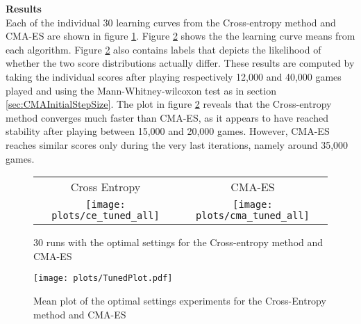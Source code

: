 \textbf{Results}\\
Each of the individual 30 learning curves from the Cross-entropy method
and CMA-ES are shown in figure \ref{fig:tunedAll}. Figure \ref{fig:TunedMean} shows the the
learning curve means from each algorithm. Figure \ref{fig:TunedMean} also contains 
labels that depicts the likelihood of whether the two score distributions actually differ.
These results are computed by taking the individual scores after playing respectively 
12,000 and 40,000 games played and using the Mann-Whitney-wilcoxon test
as in section \ref{sec:CMAInitialStepSize}. The plot in figure \ref{fig:TunedMean}
reveals that the Cross-entropy method converges much faster than CMA-ES, as it 
appears to have reached stability after playing between 15,000 and 20,000 games. However,
CMA-ES reaches similar scores only during the very last iterations, namely around 35,000 games.
\begin{figure}[H]
\begin{tabular}{@{}c@{}c@{}}
Cross Entropy & CMA-ES\\
\texttt{[image: plots/ce\_tuned\_all]} &
\texttt{[image: plots/cma\_tuned\_all]}
\end{tabular}
\caption{30 runs with the optimal settings for the Cross-entropy method and CMA-ES \label{fig:tunedAll}}
\end{figure}

\begin{figure}[H]
\centering
\texttt{[image: plots/TunedPlot.pdf]}
\caption{Mean plot of the optimal settings experiments for the Cross-Entropy method and CMA-ES \label{fig:TunedMean}}
\end{figure}

